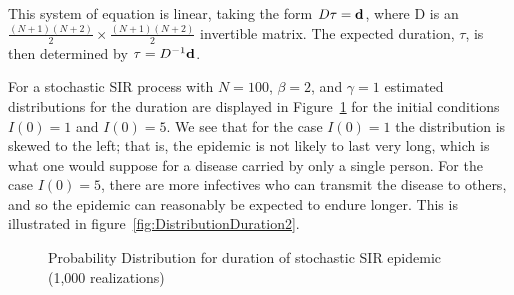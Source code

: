 \documentclass[reqno,11pt]{amsart}
\begin{document}
This system of equation is linear, taking the form $D \tau = \text{\bf d} $, where D is an $\frac{(N+1)(N+2)}{2} \times \frac{(N+1)(N+2)}{2}$   invertible matrix. The expected duration, $\tau$, is then determined by $\tau = D^{-1} \text{\bf d}$.

For a stochastic SIR process with $N=100$, $\beta = 2$, and $\gamma = 1$ estimated distributions for the duration are displayed in Figure~\ref{fig:DistributionDurations} for the initial conditions $I(0)=1$ and $I(0)=5$. We see that for the case $I(0)=1$ the distribution is skewed to the left; that is, the epidemic is not likely to last very long, which is what one would suppose for a disease carried by only a single person. For the case $I(0)=5$, there are more infectives who can transmit the disease to others, and so the epidemic can reasonably be expected to endure longer. This is illustrated in figure~\ref{fig:DistributionDuration2}.

\begin{figure}[ht]
\begin{center}
\caption{Probability Distribution for duration of stochastic SIR epidemic (1,000 realizations)}
\label{fig:DistributionDurations}
\end{center}
\end{figure}
%
%
%
%
\end{document}
